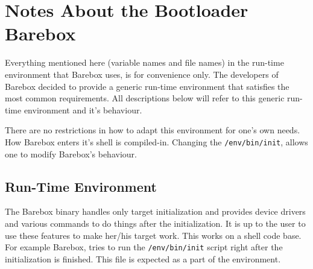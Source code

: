%
%
%
%
%
%
%

\section{Notes About the Bootloader Barebox}	\label{sec:bareboxnotes}

Everything mentioned here (variable names and file names) in the run-time
environment that Barebox uses, is for convenience only. The developers of Barebox
decided to provide a generic run-time environment that satisfies the most
common requirements. All descriptions below will refer to this generic
run-time environment and it's behaviour.

There are no restrictions in how to adapt this environment for one's own
needs. How Barebox enters it's shell is compiled-in. Changing the
\texttt{/env/bin/init}, allows one to modify Barebox's behaviour.

%
%

\subsection{Run-Time Environment}			\label{sec:bbenv}

The Barebox binary handles only target initialization and provides device
drivers and various commands to do things after the initialization. It is up to
the user to use these features to make her/his target work. This works on a
shell code base. For example Barebox, tries to run the \texttt{/env/bin/init}
script right after the initialization is finished. This file is expected
as a part of the environment.

